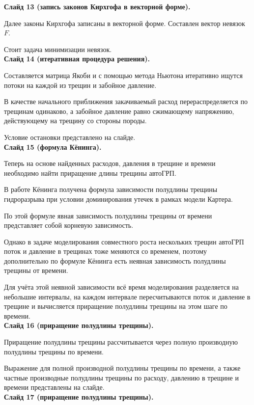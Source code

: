 \documentclass[a4paper, 12pt]{article}
\begin{document}
\textbf{Слайд 13 (запись законов Кирхгофа в векторной форме).}

Далее законы Кирхгофа записаны в векторной форме.
Составлен вектор невязок $F$.

Стоит задача минимизации невязок.\\

\textbf{Слайд 14 (итеративная процедура решения).}

Составляется матрица Якоби и с помощью метода Ньютона итеративно ищутся потоки на каждой из трещин и забойное давление.

В качестве начального приближения закачиваемый расход перераспределяется по трещинам одинаково, а забойное давление равно сжимающему напряжению, действующему на трещину со стороны породы.

Условие остановки представлено на слайде.\\

\textbf{Слайд 15 (формула Кёнинга).}

Теперь на основе найденных расходов, давления в трещине и времени необходимо найти приращение длины трещины автоГРП.

В работе Кёнинга получена формула зависимости полудлины трещины гидроразрыва при условии доминирования утечек в рамках модели Картера.

По этой формуле явная зависимость полудлины трещины от времени представляет собой корневую зависимость.

Однако в задаче моделирования совместного роста нескольких трещин автоГРП поток и давление в трещинах тоже меняются со временем, поэтому дополнительно по формуле Кёнинга есть неявная зависимость полудлины трещины от времени.

Для учёта этой неявной зависимости всё время моделирования разделяется на небольшие интервалы, на каждом интервале пересчитываются поток и давление в трещине и вычисляется приращение полудлины трещины на этом шаге по времени.\\

\textbf{Слайд 16 (приращение полудлины трещины).}

Приращение полудлины трещины рассчитывается через полную производную полудлины трещины по времени.

Выражение для полной производной полудлины трещины по времени, а также частные производные полудлины трещины по расходу, давлению в трещине и времени представлены на слайде.\\

\textbf{Слайд 17 (приращение полудлины трещины).}
\end{document}
